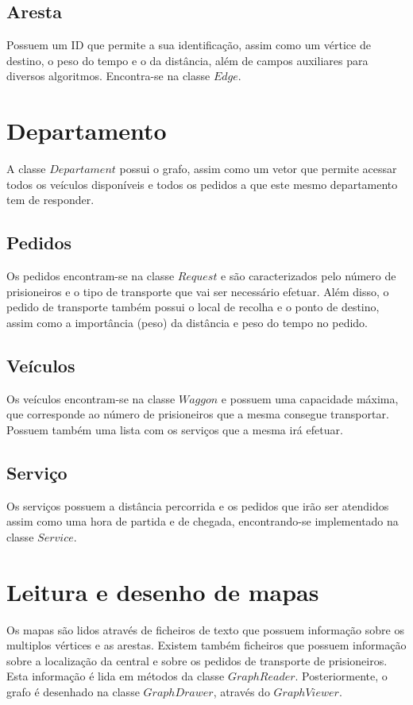 \documentclass[article, a4paper, 12pt, oneside]{memoir}
\begin{document}
\subsection{Aresta}
Possuem um ID que permite a sua identificação, assim como um vértice de destino, o peso do tempo e o da distância, além de campos auxiliares para diversos algoritmos. Encontra-se na classe $Edge$.

\section{Departamento}
A classe $Departament$ possui o grafo, assim como um vetor que permite acessar todos os veículos disponíveis e todos os pedidos a que este mesmo departamento tem de responder.

\subsection{Pedidos}
Os pedidos encontram-se na classe $Request$ e são caracterizados pelo número de prisioneiros e o tipo de transporte que vai ser necessário efetuar. Além disso, o pedido de transporte também possui o 
local de recolha e o ponto de destino, assim como a importância (peso) da distância e peso do tempo no pedido.

\subsection{Veículos}
Os veículos encontram-se na classe $Waggon$ e possuem uma capacidade máxima, que corresponde ao número de prisioneiros que a mesma consegue transportar. Possuem também uma lista 
com os serviços que a mesma irá efetuar.

\subsection{Serviço}
Os serviços possuem a distância percorrida e os pedidos que irão ser atendidos assim como uma hora de partida e de chegada, encontrando-se implementado na classe $Service$.

\section{Leitura e desenho de mapas}
Os mapas são lidos através de ficheiros de texto que possuem informação sobre os multiplos vértices e as arestas. 
Existem também ficheiros que possuem informação sobre a localização da central e sobre os pedidos de transporte de prisioneiros. Esta informação é lida em métodos da classe $GraphReader$.
Posteriormente, o grafo é desenhado na classe $GraphDrawer$, através do $GraphViewer$.
\end{document}
